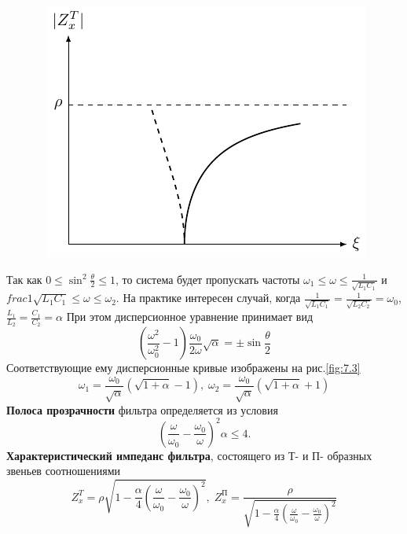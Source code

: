 \begin{figure}[h!]
	\centering 
	\includegraphics[]{chem/FHF/ZxP2.pdf}
	\caption{}
	\label{fig:7.2}
\end{figure}
Так как $\displaystyle 0\leq\sin^2\frac{\theta}{2}\leq1$, то система будет пропускать частоты $\displaystyle\omega_1\leq\omega\leq\frac{1}{\sqrt{L_1C_1}}$ и $\displaystyle frac{1}{\sqrt{L_1C_1}}\leq\omega\leq\omega_2$. На практике интересен случай, когда $\displaystyle \frac{1}{\sqrt{L_1C_1}}=\frac{1}{\sqrt{L_2C_2}}=\omega_0$, $\displaystyle \frac{L_1}{L_2}=\frac{C_1}{C_2}=\alpha$
При этом дисперсионное уравнение принимает вид
\begin{equation}
\label{eq:7.4}
\left(\frac{\omega^2}{\omega^2_0}-1\right)\frac{\omega_0}{2\omega}\sqrt{\alpha}=\pm\sin\frac{\theta}{2}
\end{equation}
Соответствующие ему дисперсионные кривые изображены на рис.\ref{fig:7.3}
\begin{equation}
\label{eq:7.5}
\omega_1=\frac{\omega_0}{\sqrt{\alpha}}(\sqrt{1+\alpha}-1),\;
\omega_2=\frac{\omega_0}{\sqrt{\alpha}}(\sqrt{1+\alpha}+1)
\end{equation}
\textbf{Полоса прозрачности} фильтра определяется из условия 
\begin{equation}
\label{eq:7.6}
\left(\frac{\omega}{\omega_0}-\frac{\omega_0}{\omega}\right)^2\alpha\leq 4.
\end{equation}
\textbf{Характеристический импеданс фильтра}, состоящего из Т- и П- образных звеньев соотношениями
\begin{equation}
\label{eq:7.7}
Z^T_x=\rho\sqrt{1-\frac{\alpha}{4}\left(\frac{\omega}{\omega_0}-\frac{\omega_0}{\omega}\right)^2},\;
Z^\text{П}_x=\frac{\rho}{\sqrt{1-\frac{\alpha}{4}\left(\frac{\omega}{\omega_0}-\frac{\omega_0}{\omega}\right)^2}}
\end{equation}
